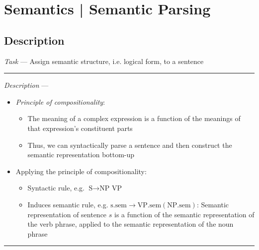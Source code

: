 \section{Semantics | Semantic Parsing}
\subsection*{Description}
\emph{Task} --- Assign semantic structure, i.e. logical form, to a sentence

{\color{lightgray}\hrule height 0.001mm}

\emph{Description} ---
\begin{itemize}
    \item \emph{Principle of compositionality}:
    \begin{itemize}
        \item The meaning of a complex expression is a function of the meanings of that expression's constituent parts
        \item Thus, we can syntactically parse a sentence and then construct the semantic representation bottom-up
    \end{itemize}
    \item Applying the principle of compositionality:
    \begin{itemize}
        \item Syntactic rule, e.g. $\textrm{S} \to \textrm{NP VP}$
        \item Induces semantic rule, e.g. $\textrm{s.sem} \to \textrm{VP.sem} (\textrm{NP.sem})$: Semantic representation of sentence $s$ is a function of the semantic representation of the verb phrase, applied to the semantic representation of the noun phrase
    \end{itemize}
\end{itemize}

{\color{black}\hrule height 0.001mm}

